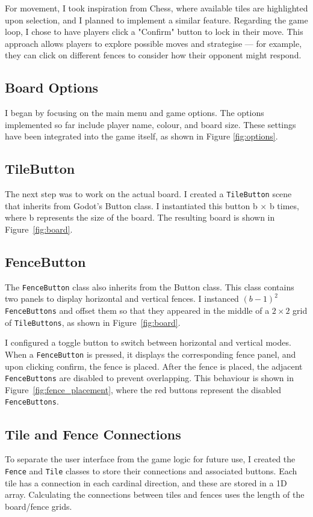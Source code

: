 \documentclass[progress]{cmpreport}
\begin{document}
\noindent For movement, I took inspiration from Chess, where available tiles are highlighted upon selection, and I planned to implement a similar feature. Regarding the game loop, I chose to have players click a "Confirm" button to lock in their move. This approach allows players to explore possible moves and strategise — for example, they can click on different fences to consider how their opponent might respond.

\subsection{Board Options}
I began by focusing on the main menu and game options. The options implemented so far include player name, colour, and board size. These settings have been integrated into the game itself, as shown in Figure \ref{fig:options}.

\subsection{TileButton}
The next step was to work on the actual board. I created a \texttt{TileButton} scene that inherits from Godot's Button class. I instantiated this button b × b times, where b represents the size of the board. The resulting board is shown in Figure~\ref{fig:board}.

\subsection{FenceButton}
The \texttt{FenceButton} class also inherits from the Button class. This class contains two panels to display horizontal and vertical fences. I instanced \((b-1)^2\) \texttt{FenceButtons} and offset them so that they appeared in the middle of a \(2 \times 2\) grid of \texttt{TileButtons}, as shown in Figure~\ref{fig:board}.

\noindent I configured a toggle button to switch between horizontal and vertical modes. When a \texttt{FenceButton} is pressed, it displays the corresponding fence panel, and upon clicking confirm, the fence is placed. After the fence is placed, the adjacent \texttt{FenceButtons} are disabled to prevent overlapping. This behaviour is shown in Figure~\ref{fig:fence_placement}, where the red buttons represent the disabled \texttt{FenceButtons}.  

\subsection{Tile and Fence Connections}
To separate the user interface from the game logic for future use, I created the \texttt{Fence} and \texttt{Tile} classes to store their connections and associated buttons. Each tile has a connection in each cardinal direction, and these are stored in a 1D array. Calculating the connections between tiles and fences uses the length of the board/fence grids.  
\end{document}
